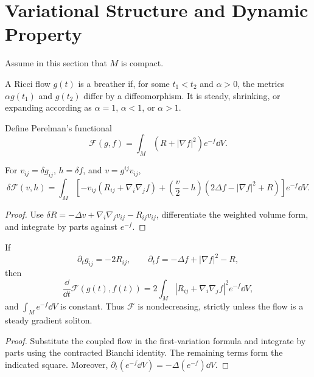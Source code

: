 \section{Variational Structure and Dynamic Property}

Assume in this section that $M$ is compact.

\begin{definition}
  \label{def:cz-ricci-breathers}
A Ricci flow $g(t)$ is a breather if, for some $t_1<t_2$ and
$\alpha>0$, the metrics $\alpha g(t_1)$ and $g(t_2)$ differ by a
diffeomorphism.  It is steady, shrinking, or expanding according as
$\alpha=1$, $\alpha<1$, or $\alpha>1$.
\end{definition}

Define Perelman's functional \cite{P1}
\[
\mathcal F(g,f)=\int_M(R+|\nabla f|^2)e^{-f}\dd V.
\]
\begin{lemma}
  \label{lem:cz-first-variation-of-perelmans-f-functional}
For $v_{ij}=\delta g_{ij}$, $h=\delta f$, and $v=g^{ij}v_{ij}$,
\[
\delta\mathcal F(v,h)=\int_M\left[-v_{ij}(R_{ij}+\nabla_i\nabla_jf)
+\left(\frac v2-h\right)(2\Delta f-|\nabla f|^2+R)\right]e^{-f}\dd V.
\]
\end{lemma}
\begin{proof}
\sketch Use
$\delta R=-\Delta v+\nabla_i\nabla_jv_{ij}-R_{ij}v_{ij}$,
differentiate the weighted volume form, and integrate by parts against
$e^{-f}$.
\end{proof}

\begin{proposition}
  \label{prop:cz-monotonicity-of-perelmans-f-functional}
If
\[
\partial_tg_{ij}=-2R_{ij},\qquad
\partial_tf=-\Delta f+|\nabla f|^2-R,
\]
then
\[
\frac{\dd}{\dd t}\mathcal F(g(t),f(t))
=2\int_M|R_{ij}+\nabla_i\nabla_jf|^2e^{-f}\dd V,
\]
and $\int_Me^{-f}\dd V$ is constant.  Thus $\mathcal F$ is
nondecreasing, strictly unless the flow is a steady gradient soliton.
\end{proposition}
\begin{proof}
\sketch Substitute the coupled flow in the first-variation formula
and integrate by parts using the contracted Bianchi identity.  The
remaining terms form the indicated square.  Moreover,
$\partial_t(e^{-f}\dd V)=-\Delta(e^{-f})\dd V$.
\end{proof}

